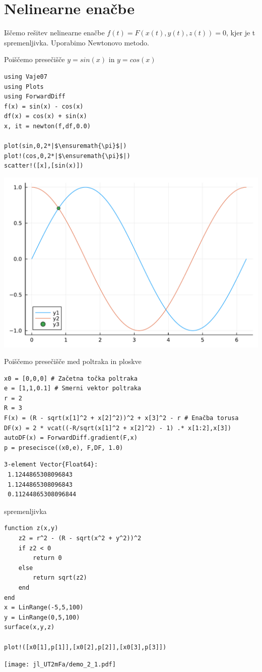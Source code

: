 \documentclass[12pt,a4paper]{article}
\begin{document}
\section{Nelinearne enačbe}
Iščemo rešitev nelinearne enačbe $f(t) = F(x(t),y(t),z(t)) = 0$, kjer je t spremenljivka. Uporabimo Newtonovo metodo.


Poiščemo presečišče $y = sin(x)$ in $y = cos(x)$


\begin{verbatim}
using Vaje07
using Plots
using ForwardDiff
f(x) = sin(x) - cos(x)
df(x) = cos(x) + sin(x)
x, it = newton(f,df,0.0)

plot(sin,0,2*|$\ensuremath{\pi}$|)
plot!(cos,0,2*|$\ensuremath{\pi}$|)
scatter!([x],[sin(x)])
\end{verbatim}
\includegraphics[width=\linewidth]{jl_UT2mFa/demo_1_1.pdf}

Poiščemo presečišče med poltraka in ploskve


\begin{verbatim}
x0 = [0,0,0] # Začetna točka poltraka
e = [1,1,0.1] # Smerni vektor poltraka
r = 2
R = 3
F(x) = (R - sqrt(x[1]^2 + x[2]^2))^2 + x[3]^2 - r # Enačba torusa
DF(x) = 2 * vcat((-R/sqrt(x[1]^2 + x[2]^2) - 1) .* x[1:2],x[3])
autoDF(x) = ForwardDiff.gradient(F,x)
p = presecisce((x0,e), F,DF, 1.0)
\end{verbatim}
\begin{verbatim}
3-element Vector{Float64}:
 1.1244865308096843
 1.1244865308096843
 0.11244865308096844
\end{verbatim}

spremenljivka


\begin{verbatim}
function z(x,y) 
    z2 = r^2 - (R - sqrt(x^2 + y^2))^2
    if z2 < 0
        return 0
    else
        return sqrt(z2)
    end
end
x = LinRange(-5,5,100)
y = LinRange(0,5,100)
surface(x,y,z)

plot!([x0[1],p[1]],[x0[2],p[2]],[x0[3],p[3]])
\end{verbatim}
\texttt{[image: jl\_UT2mFa/demo\_2\_1.pdf]}
\end{document}
